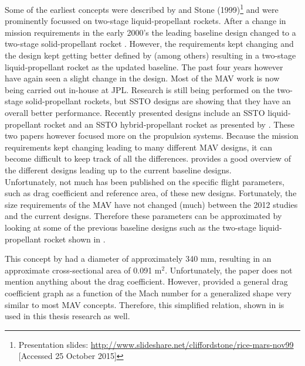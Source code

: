 Some of the earliest concepts were described by \cite{whitehead1997,guernsey1998,desai1998} and Stone (1999)\footnote{\label{stone} Presentation slides: \url{http://www.slideshare.net/cliffordstone/rice-mars-nov99} [Accessed 25 October 2015]} and were prominently focussed on two-stage liquid-propellant rockets. After a change in mission requirements in the early 2000's the leading baseline design changed to a two-stage solid-propellant rocket \citep{stephenson2002,whitehead2005,stephenson2006}. However, the requirements kept changing and the design kept getting better defined by (among others) \cite{sengupta2012,trinidad2012,mungas2012,mppg2012} resulting in a two-stage liquid-propellant rocket as the updated baseline. The past four years however have again seen a slight change in the design. Most of the \ac{MAV} work is now being carried out in-house at \ac{JPL}. Research is still being performed on the two-stage solid-propellant rockets, but \ac{SSTO} designs are showing that they have an overall better performance. Recently presented designs include an \ac{SSTO} liquid-propellant rocket \citep{vaughan2016technology} and an \ac{SSTO} hybrid-propellant rocket as presented by \cite{karp2016technology}. These two papers however focused more on the propulsion systems. Because the mission requirements kept changing leading to many different \ac{MAV} designs, it can become difficult to keep track of all the differences. \cite{shotwell2016history} provides a good overview of the different designs leading up to the current baseline designs. \\

\noindent
Unfortunately, not much has been published on the specific flight parameters, such as drag coefficient and reference area, of these new designs. Fortunately, the size requirements of the \ac{MAV} have not changed (much) between the 2012 studies and the current designs. Therefore these parameters can be approximated by looking at some of the previous baseline designs such as the two-stage liquid-propellant rocket shown in . 

This concept by \cite{trinidad2012} had a diameter of approximately 340 mm, resulting in an approximate cross-sectional area of 0.091 m$^{2}$. Unfortunately, the paper does not mention anything about the drag coefficient. However, \cite{whitehead2004mars} provided a general drag coefficient graph as a function of the Mach number for a generalized shape very similar to most \ac{MAV} concepts. Therefore, this simplified relation, shown in  is used in this thesis research as well.

